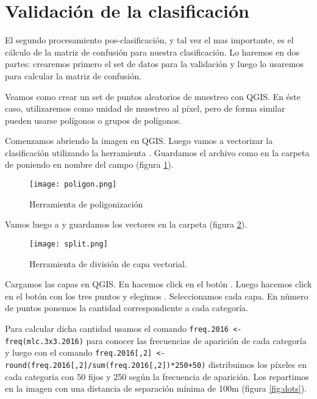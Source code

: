 \section{Validaci\'on de la clasificaci\'on}

El segundo procesamiento pos-clasificaci\'on, y tal vez el mas importante, es el c\'alculo de la matriz de confusi\'on para nuestra clasificaci\'on. Lo haremos en dos partes: crearemos primero el set de datos para la validaci\'on y luego lo usaremos para calcular la matriz de confusi\'on.

\begin{exa}
  Veamos como crear un set de puntos aleatorios de muestreo con QGIS. En \'este caso, utilizaremos como unidad de muestreo al p\'ixel, pero de forma similar pueden usarse pol\'igonos o grupos de pol\'igonos.

  Comenzamos abriendo la imagen  en QGIS. Luego vamos a vectorizar la clasificaci\'on utilizando la herramienta . Guardamos el archivo como  en la carpeta de  poniendo en nombre del campo  (figura \ref{fig:poligon}).

  \begin{figure}[h!]
    \centering
    \texttt{[image: poligon.png]}
    \caption{Herramienta de poligonizaci\'on}
    \label{fig:poligon}
  \end{figure}

  Vamos luego a  y guardamos los vectores en la carpeta  (figura \ref{fig:split}).

  \begin{figure}[h!]
    \centering
    \texttt{[image: split.png]}
    \caption{Herramienta de divisi\'on de capa vectorial.}
    \label{fig:split}
  \end{figure}

  Cargamos las capas en QGIS. En  hacemos click en el bot\'on . Luego hacemos click en el bot\'on con los tres puntos y elegimos .  Seleccionamos cada capa. En n\'umero de puntos ponemos la cantidad correspondiente a cada categor\'ia.

  Para calcular dicha cantidad usamos el comando \texttt{freq.2016 <- freq(mlc.3x3.2016)}  para conocer las frecuencias de aparici\'on de cada categor\'ia y luego con el comando  \texttt{freq.2016[,2] <- round(freq.2016[,2]/sum(freq.2016[,2])*250+50)} distribuimos  los p\'ixeles en cada categoria con 50 fijos y 250 seg\'un la frecuencia de aparici\'on.
  Los repartimos en la imagen con una distancia de separaci\'on m\'inima de 100m (figura \ref{fig:dots}).


\end{exa}
